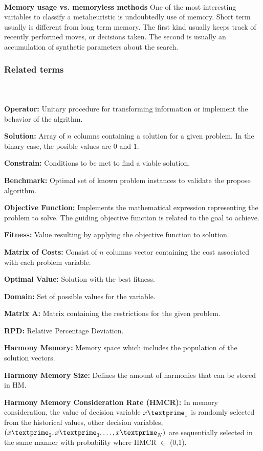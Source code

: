 ~\\
\textbf{Memory usage vs. memoryless methods}
One of the most interesting variables to classify a metaheuristic is undoubtedly use of memory. Short term usually is different from long term memory. The first kind usually keeps track of recently performed moves, or decisions taken. The second is usually an accumulation of synthetic parameters about the search. 

\subsubsection{Related terms}
~\\~\\
\textbf{Operator:} 
Unitary procedure for transforming information or implement the behavior of the algrithm.

\textbf{Solution:} 
Array of $n$ columns containing a solution for a given problem. In the binary case, the posible values are $0$ and $1$.

\textbf{Constrain:} 
Conditions to be met to find a viable solution.

\textbf{Benchmark:} 
Optimal set of known problem instances to validate the propose algorithm.

\textbf{Objective Function:}  
Implements the mathematical expression representing the problem to solve. The guiding objective function is related to the goal to achieve.

\textbf{Fitness:} 
Value resulting by applying the objective function to solution.

\textbf{Matrix of Costs:} 
Consist of $n$ columns vector containing the cost associated with each problem variable.

\textbf{Optimal Value:} 
Solution with the best fitness.

\textbf{Domain:} 
Set of possible values for the variable.

\textbf{Matrix A:} 
Matrix containing the restrictions for the given problem.

\textbf{RPD:} 
Relative Percentage Deviation.

\textbf{Harmony Memory:} 
Memory space which includes the population of the solution vectors.

\textbf{Harmony Memory Size:} 
Defines the amount of harmonies that can be stored in HM.

\textbf{Harmony Memory Consideration Rate (HMCR):} 
In memory consideration, the value of decision variable ${x\textprime}_1$ is randomly selected from the historical values, other decision variables, $({x\textprime}_2, {x\textprime}_3,\dots,{x\textprime}_N)$ are sequentially selected in the same manner with probability where HMCR $\in$ (0,1).

